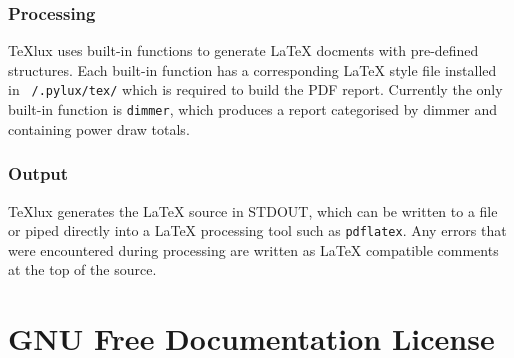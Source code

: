 \documentclass[a4paper]{article}
\begin{document}
\subsubsection{Processing}

TeXlux uses built-in functions to generate \LaTeX{} docments with pre-defined 
structures. Each built-in function has a corresponding \LaTeX{} style file 
installed in \texttt{~/.pylux/tex/} which is required to build the PDF report. 
Currently the only built-in function is \texttt{dimmer}, which produces a 
report categorised by dimmer and containing power draw totals.

\subsubsection{Output}

TeXlux generates the \LaTeX{} source in STDOUT, which can be written to a 
file or piped directly into a \LaTeX{} processing tool such as 
\texttt{pdflatex}. Any errors that were encountered during processing are 
written as \LaTeX{} compatible comments at the top of the source.

\section{GNU Free Documentation License}

\end{document}
